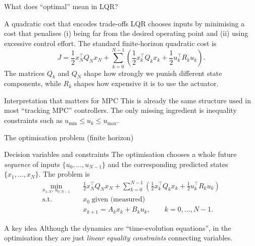 \documentclass[aspectratio=169,11pt]{beamer}
\begin{document}
\begin{frame}{What does ``optimal'' mean in LQR?}
\begin{block}{A quadratic cost that encodes trade-offs}
LQR chooses inputs by minimising a cost that penalises (i) being far from the desired operating point and (ii) using excessive control effort.
The standard finite-horizon quadratic cost is
\[
J = \frac{1}{2}x_N^\top Q_N x_N + \sum_{k=0}^{N-1}\left(\frac{1}{2}x_k^\top Q_k x_k + \frac{1}{2}u_k^\top R_k u_k\right).
\]
The matrices $Q_k$ and $Q_N$ shape how strongly we punish different state components, while $R_k$ shapes how expensive it is to use the actuator.
\end{block}

\begin{alertblock}{Interpretation that matters for MPC}
This is already the same structure used in most ``tracking MPC'' controllers. The only missing ingredient is inequality constraints such as $u_{\min}\le u_k\le u_{\max}$.
\end{alertblock}
\end{frame}

\begin{frame}{The optimisation problem (finite horizon)}
\begin{block}{Decision variables and constraints}
The optimisation chooses a whole future \emph{sequence} of inputs $\{u_0,\dots,u_{N-1}\}$ and the corresponding predicted states $\{x_1,\dots,x_N\}$. The problem is
\[
\begin{aligned}
\min_{x_{1:N},\,u_{0:N-1}}\quad & \frac{1}{2}x_N^\top Q_N x_N + \sum_{k=0}^{N-1}\left(\frac{1}{2}x_k^\top Q_k x_k + \frac{1}{2}u_k^\top R_k u_k\right)\\
\text{s.t.}\quad & x_0\;\text{given (measured)}\\
& x_{k+1} = A_k x_k + B_k u_k,\qquad k=0,\dots,N-1.
\end{aligned}
\]
\end{block}

\begin{block}{A key idea}
Although the dynamics are ``time-evolution equations'', in the optimisation they are just \emph{linear equality constraints} connecting variables.
\end{block}
\end{frame}
\end{document}
